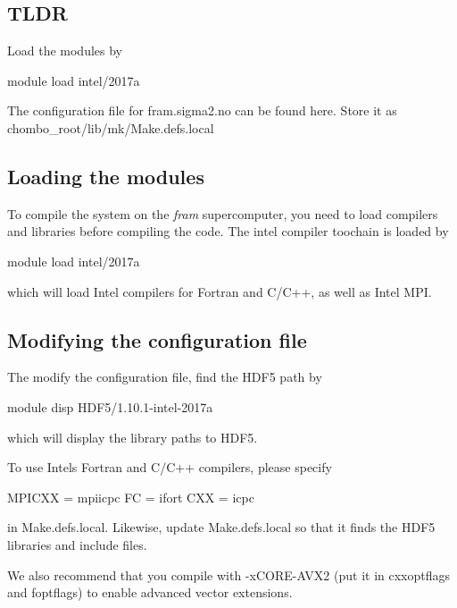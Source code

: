 \subsection*{T\+L\+DR }

Load the modules by \begin{DoxyVerb}module load intel/2017a
\end{DoxyVerb}


The configuration file for fram.\+sigma2.\+no can be found here. Store it as chombo\+\_\+root/lib/mk/\+Make.\+defs.\+local

\subsection*{Loading the modules }

To compile the system on the {\itshape fram} supercomputer, you need to load compilers and libraries before compiling the code. The intel compiler toochain is loaded by \begin{DoxyVerb}module load intel/2017a
\end{DoxyVerb}


which will load Intel compilers for Fortran and C/\+C++, as well as Intel M\+PI.

\subsection*{Modifying the configuration file }

The modify the configuration file, find the H\+D\+F5 path by \begin{DoxyVerb}module disp HDF5/1.10.1-intel-2017a
\end{DoxyVerb}


which will display the library paths to H\+D\+F5.

To use Intel\textquotesingle{}s Fortran and C/\+C++ compilers, please specify \begin{DoxyVerb} MPICXX = mpiicpc
 FC     = ifort
 CXX    = icpc
\end{DoxyVerb}


in Make.\+defs.\+local. Likewise, update Make.\+defs.\+local so that it finds the H\+D\+F5 libraries and include files.

We also recommend that you compile with -\/x\+C\+O\+R\+E-\/\+A\+V\+X2 (put it in cxxoptflags and foptflags) to enable advanced vector extensions. 